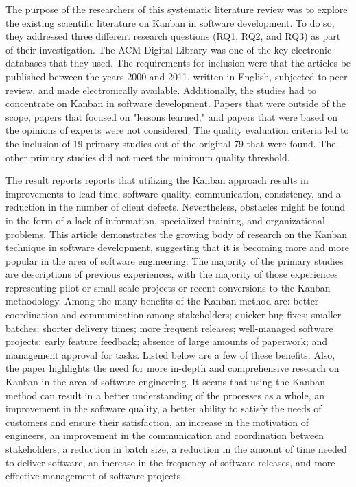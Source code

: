 \documentclass[conference]{IEEEtran}
\begin{document}
The purpose of the researchers of this systematic literature review was to explore the existing scientific literature on Kanban in software development. To do so, they addressed three different research questions (RQ1, RQ2, and RQ3) as part of their investigation. The ACM Digital Library was one of the key electronic databases that they used. The requirements for inclusion were that the articles be published between the years 2000 and 2011, written in English, subjected to peer review, and made electronically available. Additionally, the studies had to concentrate on Kanban in software development. Papers that were outside of the scope, papers that focused on "lessons learned," and papers that were based on the opinions of experts were not considered. The quality evaluation criteria led to the inclusion of 19 primary studies out of the original 79 that were found. The other primary studies did not meet the minimum quality threshold.

The result reports reports that utilizing the Kanban approach results in improvements to lead time, software quality, communication, consistency, and a reduction in the number of client defects. Nevertheless, obstacles might be found in the form of a lack of information, specialized training, and organizational problems. This article demonstrates the growing body of research on the Kanban technique in software development, suggesting that it is becoming more and more popular in the area of software engineering. The majority of the primary studies are descriptions of previous experiences, with the majority of those experiences representing pilot or small-scale projects or recent conversions to the Kanban methodology.
Among the many benefits of the Kanban method are: better coordination and communication among stakeholders; quicker bug fixes; smaller batches; shorter delivery times; more frequent releases; well-managed software projects; early feature feedback; absence of large amounts of paperwork; and management approval for tasks. Listed below are a few of these benefits.
Also, the paper highlights the need for more in-depth and comprehensive research on Kanban in the area of software engineering. It seems that using the Kanban method can result in a better understanding of the processes as a whole, an improvement in the software quality, a better ability to satisfy the needs of customers and ensure their satisfaction, an increase in the motivation of engineers, an improvement in the communication and coordination between stakeholders, a reduction in batch size, a reduction in the amount of time needed to deliver software, an increase in the frequency of software releases, and more effective management of software projects.
\newline
\newline
\end{document}
